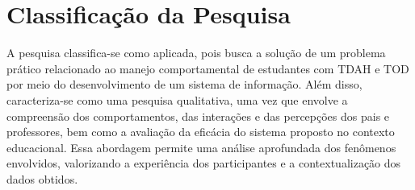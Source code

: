 \vspace{0.3cm}
\section{Classificação da Pesquisa}

A pesquisa classifica-se como aplicada, pois busca a solução de um problema prático relacionado ao manejo comportamental de estudantes com TDAH e TOD por meio do desenvolvimento de um sistema de informação. Além disso, caracteriza-se como uma pesquisa qualitativa, uma vez que envolve a compreensão dos comportamentos, das interações e das percepções dos pais e professores, bem como a avaliação da eficácia do sistema proposto no contexto educacional. Essa abordagem permite uma análise aprofundada dos fenômenos envolvidos, valorizando a experiência dos participantes e a contextualização dos dados obtidos.
